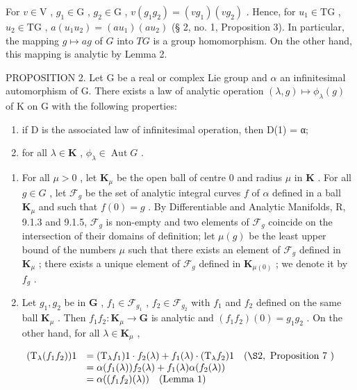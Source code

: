 For \(v \in \mathrm{V}\) , \(g_1 \in \mathrm{G}\) , \(g_2 \in \mathrm{G}\) , \(v(g_1g_2) = (vg_1)(vg_2)\) . Hence, for \(u_1 \in \mathrm{TG}\) , \(u_2 \in \mathrm{TG}\) , \(a(u_1u_2) = (au_1)(au_2)\) (§ 2, no. 1, Proposition 3). In particular, the mapping \(g \mapsto ag\) of \(G\) into \(TG\) is a group homomorphism. On the other hand, this mapping is analytic by Lemma 2.

PROPOSITION 2. Let G be a real or complex Lie group and \(\alpha\) an infinitesimal automorphism of G. There exists a law of analytic operation \((\lambda, g) \mapsto \phi_{\lambda}(g)\) of K on G with the following properties:

\begin{enumerate}
\def\labelenumi{(\arabic{enumi})}
\item
  if D is the associated law of infinitesimal operation, then D(1) = α;
\item
  for all \(\lambda \in \mathbf{K}\) , \(\phi_{\lambda} \in \operatorname{Aut} G\) .
\end{enumerate}

\begin{enumerate}
\def\labelenumi{(\alph{enumi})}
\item
  For all \(\mu > 0\) , let \(\mathbf{K}_{\mu}\) be the open ball of centre 0 and radius \(\mu\) in \(\mathbf{K}\) . For all \(g \in G\) , let \(\mathcal{F}_g\) be the set of analytic integral curves \(f\) of \(\alpha\) defined in a ball \(\mathbf{K}_{\mu}\) and such that \(f(0) = g\) . By Differentiable and Analytic Manifolds, R, 9.1.3 and 9.1.5, \(\mathcal{F}_g\) is non-empty and two elements of \(\mathcal{F}_g\) coincide on the intersection of their domains of definition; let \(\mu(g)\) be the least upper bound of the numbers \(\mu\) such that there exists an element of \(\mathcal{F}_g\) defined in \(\mathbf{K}_{\mu}\) ; there exists a unique element of \(\mathcal{F}_g\) defined in \(\mathbf{K}_{\mu(0)}\) ; we denote it by \(f_g\) .
\item
  Let \(g_1, g_2\) be in \(\mathbf{G}\) , \(f_1 \in \mathcal{F}_{g_1}\) , \(f_2 \in \mathcal{F}_{g_2}\) with \(f_1\) and \(f_2\) defined on the same ball \(\mathbf{K}_\mu\) . Then \(f_1f_2: \mathbf{K}_\mu \to \mathbf{G}\) is analytic and \((f_1f_2)(0) = g_1g_2\) . On the other hand, for all \(\lambda \in \mathbf{K}_\mu\) ,
\end{enumerate}

\[
\begin{array}{r l} (\mathrm{T} _ {\lambda} (f _ {1} f _ {2})) 1 & = (\mathrm{T} _ {\lambda} f _ {1}) 1 \cdot f _ {2} (\lambda) + f _ {1} (\lambda) \cdot (\mathrm{T} _ {\lambda} f _ {2}) 1 \quad (\S 2, \text { Proposition   7 }) \\ & = \alpha (f _ {1} (\lambda)) f _ {2} (\lambda) + f _ {1} (\lambda) \alpha (f _ {2} (\lambda)) \\ & = \alpha ((f _ {1} f _ {2}) (\lambda)) \quad \text {(Lemma   1)} \end{array}
\]

